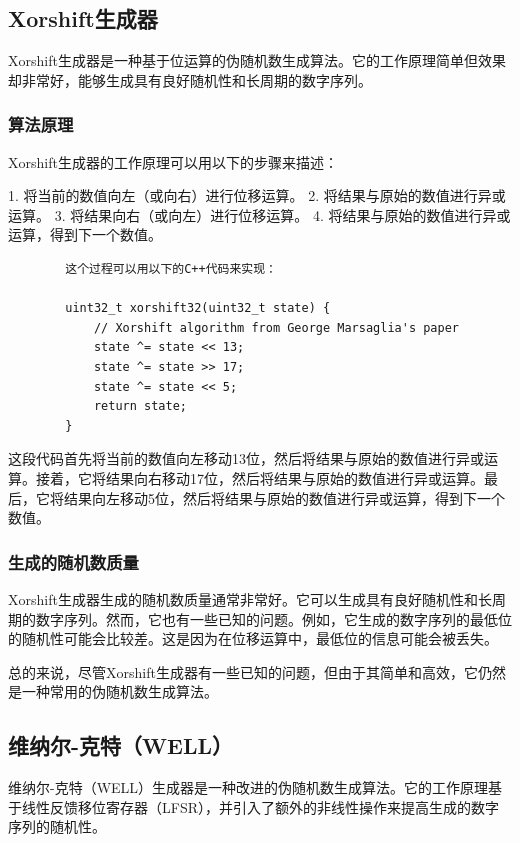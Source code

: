 \documentclass{ctexart}
\begin{document}
    \subsection{Xorshift生成器}

    Xorshift生成器是一种基于位运算的伪随机数生成算法。它的工作原理简单但效果却非常好，能够生成具有良好随机性和长周期的数字序列。

        \subsubsection{算法原理}

        Xorshift生成器的工作原理可以用以下的步骤来描述：

        1. 将当前的数值向左（或向右）进行位移运算。
        2. 将结果与原始的数值进行异或运算。
        3. 将结果向右（或向左）进行位移运算。
        4. 将结果与原始的数值进行异或运算，得到下一个数值。

        \begin{lstlisting}
        这个过程可以用以下的C++代码来实现：

        uint32_t xorshift32(uint32_t state) {
            // Xorshift algorithm from George Marsaglia's paper
            state ^= state << 13;
            state ^= state >> 17;
            state ^= state << 5;
            return state;
        }
        \end{lstlisting}
        这段代码首先将当前的数值向左移动13位，然后将结果与原始的数值进行异或运算。接着，它将结果向右移动17位，然后将结果与原始的数值进行异或运算。最后，它将结果向左移动5位，然后将结果与原始的数值进行异或运算，得到下一个数值。
        \subsubsection{生成的随机数质量}
        Xorshift生成器生成的随机数质量通常非常好。它可以生成具有良好随机性和长周期的数字序列。然而，它也有一些已知的问题。例如，它生成的数字序列的最低位的随机性可能会比较差。这是因为在位移运算中，最低位的信息可能会被丢失。

        总的来说，尽管Xorshift生成器有一些已知的问题，但由于其简单和高效，它仍然是一种常用的伪随机数生成算法。
        \subsection{维纳尔-克特（WELL）}

        维纳尔-克特（WELL）生成器是一种改进的伪随机数生成算法。它的工作原理基于线性反馈移位寄存器（LFSR），并引入了额外的非线性操作来提高生成的数字序列的随机性。
\end{document}
